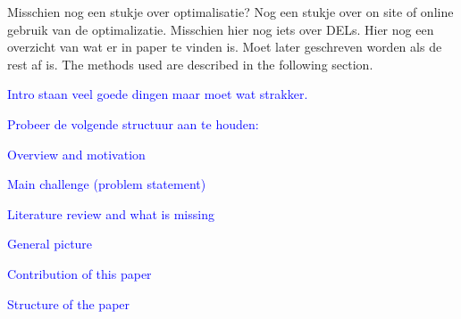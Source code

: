 Misschien nog een stukje over optimalisatie?
Nog een stukje over on site of online gebruik van de optimalizatie. Misschien hier nog iets over DELs.
Hier nog een overzicht van wat er in paper te vinden is. Moet later geschreven worden als de rest af is.
The methods used are described in the following section.


\textcolor{blue}{Intro staan veel goede dingen maar moet wat strakker.} 

\textcolor{blue}{Probeer de volgende structuur aan te houden:}

\textcolor{blue}{Overview and motivation}

\textcolor{blue}{Main challenge (problem statement)}

\textcolor{blue}{Literature review and what is missing}

\textcolor{blue}{General picture}

\textcolor{blue}{Contribution of this paper}

\textcolor{blue}{Structure of the paper}
